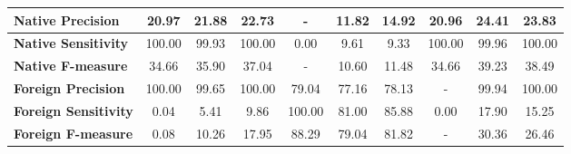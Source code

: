 \begin{table}[htp]
{\begin{tabular}{l|c|c|c|c|c|c|c|c|c|}
			\multicolumn{1}{|l|}{\textbf{Native Precision}}          & 20.97                             & 21.88                             & 22.73                            & -                                 & 11.82                             & 14.92                            & 20.96                             & 24.41                             & 23.83                            \\ \hline
			\multicolumn{1}{|l|}{\textbf{Native Sensitivity}}        & 100.00                            & 99.93                             & 100.00                           & 0.00                              & 9.61                              & 9.33                             & 100.00                            & 99.96                             & 100.00                           \\ \hline
			\multicolumn{1}{|l|}{\textbf{Native F-measure}}          & 34.66                             & 35.90                             & 37.04                            & -                                 & 10.60                             & 11.48                            & 34.66                             & 39.23                             & 38.49                            \\ \hline
			\multicolumn{1}{|l|}{\textbf{Foreign Precision}}         & 100.00                            & 99.65                             & 100.00                           & 79.04                             & 77.16                             & 78.13                            & -                                 & 99.94                             & 100.00                           \\ \hline
			\multicolumn{1}{|l|}{\textbf{Foreign Sensitivity}}       & 0.04                              & 5.41                              & 9.86                             & 100.00                            & 81.00                             & 85.88                            & 0.00                              & 17.90                             & 15.25                            \\ \hline
			\multicolumn{1}{|l|}{\textbf{Foreign F-measure}}         & 0.08                              & 10.26                             & 17.95                            & 88.29                             & 79.04                             & 81.82                            & -                                 & 30.36                             & 26.46                            \\ \hline
		\end{tabular}
	}
\end{table}

